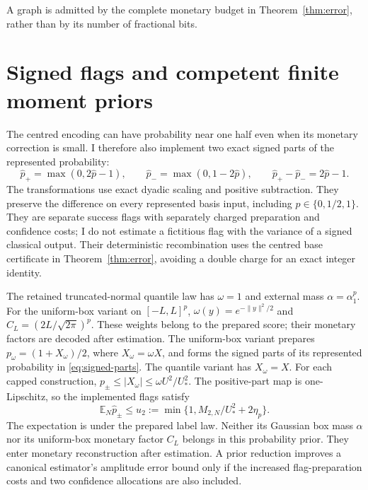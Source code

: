 \documentclass[11pt]{article}
\newcommand{\E}{\mathbb E}
\begin{document}
A graph is admitted by the complete monetary budget in
Theorem~\ref{thm:error}, rather than by its number of fractional bits.

\section{Signed flags and competent finite moment priors}
\label{sec:priors}

The centred encoding can have probability near one half even when its
monetary correction is small.  I therefore also implement two exact signed
parts of the represented probability:
\begin{equation}
 \widehat p_+=\max(0,2\widehat p-1),\qquad
 \widehat p_-=\max(0,1-2\widehat p),\qquad
 \widehat p_+-\widehat p_-=2\widehat p-1.
 \label{eq:signed-parts}
\end{equation}
The transformations use exact dyadic scaling and positive subtraction.
They preserve the difference on every represented basis input, including
$\widehat p\in\{0,1/2,1\}$.
They are separate success flags with separately charged preparation and
confidence costs; I do not estimate a fictitious flag with the variance of
a signed classical output.  Their deterministic recombination uses the
centred base certificate in Theorem~\ref{thm:error}, avoiding a double
charge for an exact integer identity.

The retained truncated-normal quantile law has $\omega=1$ and external
mass $\alpha=\alpha_1^p$. For the uniform-box variant on $[-L,L]^p$,
$\omega(y)=e^{-\|y\|^2/2}$ and $C_L=(2L/\sqrt{2\pi})^p$.
These weights belong to the prepared score; their monetary factors are
decoded after estimation. The uniform-box variant prepares
$p_\omega=(1+X_\omega)/2$, where $X_\omega=\omega X$, and forms the
signed parts of its represented probability in \eqref{eq:signed-parts}.
The quantile variant has $X_\omega=X$. For each capped construction,
$p_\pm\leq|X_\omega|\leq\omega U^2/U_*^2$.
The positive-part map is one-Lipschitz, so the implemented flags satisfy
\begin{equation}
 \E_N\widehat p_\pm\leq
 u_2:=\min\{1,M_{2,N}/U_*^2+2\eta_p\}.
 \label{eq:rare-prior}
\end{equation}
The expectation is under the prepared label law.  Neither its Gaussian
box mass $\alpha$ nor its uniform-box monetary factor $C_L$ belongs in
this probability prior.  They enter monetary reconstruction after
estimation.  A prior reduction improves a canonical estimator's amplitude
error bound only if the increased flag-preparation costs and two confidence
allocations are also included.
\end{document}
